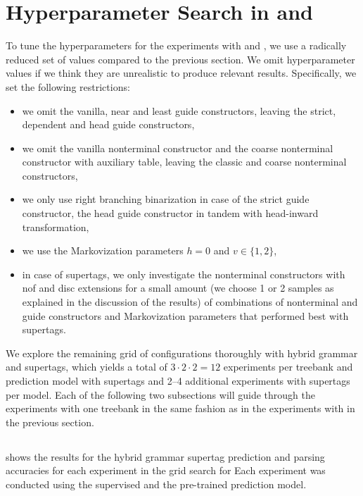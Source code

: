 \documentclass[../../document.tex]{subfiles}
\begin{document}
    \section{Hyperparameter Search in   and }\label{sec:gridsearch:other}
    To tune the hyperparameters for the experiments with  and \tiger{}, we use a radically reduced set of values compared to the previous section.
    We omit hyperparameter values if we think they are unrealistic to produce relevant results.
    Specifically, we set the following restrictions:
    \begin{itemize}
        \item we omit the vanilla, near and least guide constructors, leaving the strict, dependent and head guide constructors,
        \item we omit the vanilla nonterminal constructor and the coarse nonterminal constructor with auxiliary table, leaving the classic and coarse nonterminal constructors,
        \item we only use right branching binarization in case of the strict guide constructor, the head guide constructor in tandem with head-inward transformation,
        \item we use the Markovization parameters \(h = 0\) and \(v \in \{1,2\}\),
        \item in case of  supertags, we only investigate the nonterminal constructors with nof and disc extensions for a small amount (we choose 1 or 2 samples as explained in the discussion of the results) of combinations of nonterminal and guide constructors and Markovization parameters that performed best with  supertags.
    \end{itemize}

    We explore the remaining grid of configurations thoroughly with hybrid grammar and  supertags, which yields a total of $3 \cdot 2 \cdot 2 = 12$ experiments per treebank and prediction model with  supertags and 2--4 additional experiments with  supertags per model.
    Each of the following two subsections will guide through the experiments with one treebank in the same fashion as in the experiments with \negra{} in the previous section.

    \subsection{}
     shows the results for the hybrid grammar supertag prediction and parsing accuracies for each experiment in the grid search for 
    Each experiment was conducted using the supervised and the pre-trained prediction model.
\end{document}
